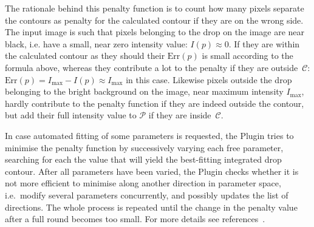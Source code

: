 \documentclass[fleqn]{scrartcl}
\begin{document}
The rationale behind this penalty function is to count how many pixels separate the contours as penalty for the calculated contour if they are on
the wrong side. The input image is such that pixels belonging to the
drop on the image are near black, i.e. have a small, near zero intensity value: $I(p) \approx 0$. If they are within the calculated contour as they
should their $\mathrm{Err}(p)$ is small according to the formula
above, whereas they contribute a lot to the penalty if they are
outside~$\mathcal{C}$: $\mathrm{Err}(p) = I_{\mathrm{max}} - I(p)
\approx I_{\mathrm{max}}$ in this case. Likewise pixels outside the
drop belonging to the bright background on the image, near maximum
intensity $I_{\mathrm{max}}$, hardly contribute to the penalty
function if they are indeed outside the contour, but add their full
intensity value to $\mathcal{P}$ if they are inside~$\mathcal{C}$.

 In case
automated fitting of some parameters is requested, the Plugin tries
to minimise the penalty function by successively varying each free
parameter, searching for each the value that will yield the
best-fitting integrated drop contour. After all parameters have been
varied, the Plugin checks whether it is not more efficient to
minimise along another direction in parameter space, i.e.\ modify
several parameters concurrently, and possibly updates the list of
directions. The whole process is repeated until the change in the
penalty value after a full round becomes too small. For more details
see references~\cite{Powell1965,Brandt1992}. \\
\end{document}
